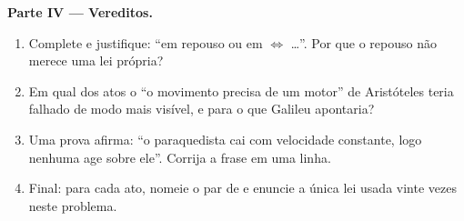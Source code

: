 \begin{problem}
\medskip
\noindent\textbf{Parte IV --- Vereditos.}
\begin{enumerate}[resume]
  \item Complete e justifique: ``em repouso ou em  $\iff$ \dots''. Por que o repouso não merece uma lei
        própria?
  \item Em qual dos atos o ``o movimento precisa de um motor'' de
        Aristóteles teria falhado de modo mais visível, e para o que
        Galileu apontaria?
  \item Uma prova afirma: ``o paraquedista cai com velocidade constante,
        logo nenhuma  age sobre ele''. Corrija a frase em uma linha.
  \item Final: para cada ato, nomeie o par de  e
        enuncie a única lei usada vinte vezes neste problema.
\end{enumerate}
\end{problem}
